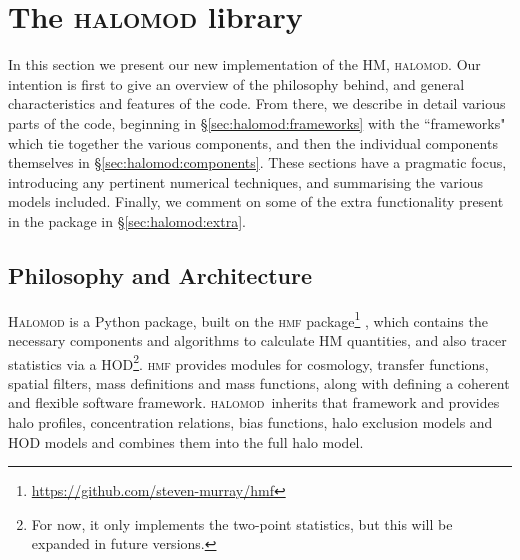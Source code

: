 \documentclass[5p,aas_macros]{elsarticle}
\newcommand{\halomod}{\textsc{halomod}}
\newcommand{\bd}[1]{\textcolor{purple}{\textbf{[BD: #1]}}}
\newcommand{\sgm}[1]{\textcolor{green}{\textbf{[SM: #1]}}}
\begin{document}
\section{The \textsc{halomod} library}
\label{sec:halomod}

In this section we present our new implementation of the HM, \textsc{halomod}. Our intention is first to give an overview of the philosophy behind, and general characteristics and features of the code. From there, we describe in detail various parts of the code, beginning in \S\ref{sec:halomod:frameworks} with the ``frameworks" which tie together the various components, and then the individual components themselves in \S\ref{sec:halomod:components}. These sections have a pragmatic focus, introducing any pertinent numerical techniques, and summarising the various models included. Finally, we comment on some of the extra functionality present in the package in \S\ref{sec:halomod:extra}.


 
\subsection{Philosophy and Architecture}
\label{sec:halomod:overview}
\textsc{Halomod} is a Python package, built on the \textsc{hmf} package\footnote{\url{https://github.com/steven-murray/hmf}} \citep{Murray2013a}, which contains the necessary components and algorithms to calculate HM quantities, and also tracer statistics via a HOD\footnote{For now, it only implements the two-point statistics, but this will be expanded in future versions.}. 
\textsc{hmf} provides modules for cosmology, transfer functions, spatial filters, mass definitions and mass functions, along with defining a coherent and flexible software framework. 
\halomod\ inherits that framework and provides halo profiles, concentration relations, bias functions, halo exclusion models and HOD models and combines them into the full halo model.


\end{document}
